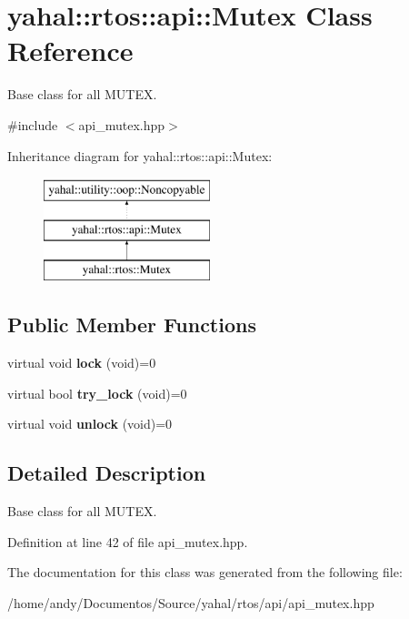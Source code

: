 \hypertarget{classyahal_1_1rtos_1_1api_1_1_mutex}{}\section{yahal\+:\+:rtos\+:\+:api\+:\+:Mutex Class Reference}
\label{classyahal_1_1rtos_1_1api_1_1_mutex}


Base class for all M\+U\+T\+E\+X.  




{\ttfamily \#include $<$api\+\_\+mutex.\+hpp$>$}

Inheritance diagram for yahal\+:\+:rtos\+:\+:api\+:\+:Mutex\+:\begin{figure}[H]
\begin{center}
\leavevmode
\includegraphics[height=3.000000cm]{classyahal_1_1rtos_1_1api_1_1_mutex}
\end{center}
\end{figure}
\subsection*{Public Member Functions}
\begin{DoxyCompactItemize}
\item 
\hypertarget{classyahal_1_1rtos_1_1api_1_1_mutex_a34dcfba67a052a8f4a28a513108a2920}{}virtual void {\bfseries lock} (void)=0\label{classyahal_1_1rtos_1_1api_1_1_mutex_a34dcfba67a052a8f4a28a513108a2920}

\item 
\hypertarget{classyahal_1_1rtos_1_1api_1_1_mutex_a32b7f850efd201d11dde4a98a298af68}{}virtual bool {\bfseries try\+\_\+lock} (void)=0\label{classyahal_1_1rtos_1_1api_1_1_mutex_a32b7f850efd201d11dde4a98a298af68}

\item 
\hypertarget{classyahal_1_1rtos_1_1api_1_1_mutex_ac5b67f3c507906dd24a3db27868b3b4a}{}virtual void {\bfseries unlock} (void)=0\label{classyahal_1_1rtos_1_1api_1_1_mutex_ac5b67f3c507906dd24a3db27868b3b4a}

\end{DoxyCompactItemize}


\subsection{Detailed Description}
Base class for all M\+U\+T\+E\+X. 

Definition at line 42 of file api\+\_\+mutex.\+hpp.



The documentation for this class was generated from the following file\+:\begin{DoxyCompactItemize}
\item 
/home/andy/\+Documentos/\+Source/yahal/rtos/api/api\+\_\+mutex.\+hpp\end{DoxyCompactItemize}
